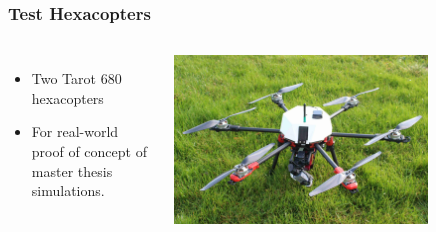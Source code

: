 \documentclass[aspectratio=169]{rubeamer}
\begin{document}
\begin{frame}
  \frametitle{Test Hexacopters}
  \begin{columns}
    \begin{itemize}
      \item Two Tarot 680 hexacopters
      \item For real-world proof of concept of master thesis simulations.
    \end{itemize}
    \centering
    \includegraphics[width=0.75\textwidth]{coral_drone}\\
  \end{columns}
\end{frame}
\end{document}

